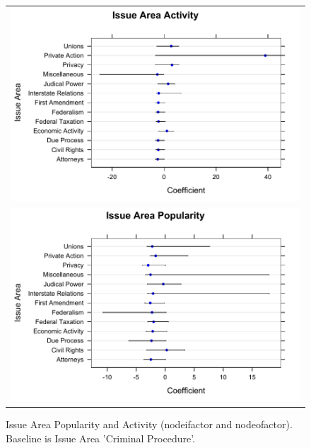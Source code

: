 \documentclass[headsepline=true, abstracton]{scrartcl}
\begin{document}
 \begin{figure}[H]
  \begin{tabular}{c}
\includegraphics[width = 1\textwidth, trim= 0.1cm 1cm 0.1cm .1cm,clip=true]{issuearea_activity}
 \\
\includegraphics[width = 1\textwidth, trim= 0.1cm 1cm 0.1cm .1cm,clip=true]{issuearea_popularity}
\end{tabular}
\caption{Issue Area Popularity and Activity (nodeifactor and nodeofactor). Baseline is Issue Area 'Criminal Procedure'.}
\end{figure} 
\end{document}
